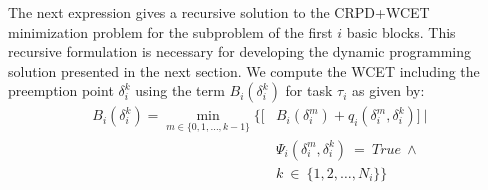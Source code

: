 \noindent
The next expression gives a recursive solution to the CRPD+WCET minimization problem for the subproblem of the first $i$ basic blocks.  This recursive formulation is necessary for developing the dynamic programming solution presented in the next section.  We compute the WCET including the preemption point $\delta_i^k$ using the term \begin{math}B_{i}(\delta_{i}^{k})\end{math} for task \begin{math}\tau_{i}\end{math} as given by:
%
\begin{equation}\label{eqn:bbkwcet-cost}
\begin{split}
   B_{i}(\delta_{i}^{k}) = \min_{m \in \{0,1, \ldots, k-1\}}
   \Big\{\Big[&B_{i}(\delta_{i}^{m}) + q_{i}(\delta_{i}^{m},\delta_{i}^{k})\Big]\ |\\
   &\Psi_{i}(\delta_{i}^{m},\delta_{i}^{k})\ =\ True\ \wedge\\&k\ \in\ \{1, 2, \ldots, N_i\}\Big\}
\end{split}
\end{equation}
